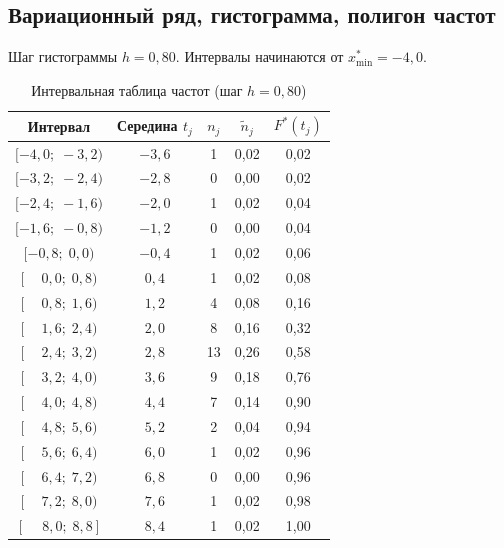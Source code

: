 \documentclass[12pt,a4paper]{article}
\begin{document}
	
	\subsection{Вариационный ряд, гистограмма, полигон частот}
	
	Шаг гистограммы $h = 0{,}80$. Интервалы начинаются от $x_{\min}^* = -4{,}0$.
	
	\begin{table}[H]
		\centering
		\small
		\begin{tabular}{ccccc}
			\toprule
			Интервал & Середина $t_j$ & $n_j$ & $\tilde{n}_j$ & $F^*(t_j)$ \\
			\midrule
			$[-4{,}0;\;-3{,}2)$ & $-3{,}6$ & 1 & 0{,}02 & 0{,}02 \\
			$[-3{,}2;\;-2{,}4)$ & $-2{,}8$ & 0 & 0{,}00 & 0{,}02 \\
			$[-2{,}4;\;-1{,}6)$ & $-2{,}0$ & 1 & 0{,}02 & 0{,}04 \\
			$[-1{,}6;\;-0{,}8)$ & $-1{,}2$ & 0 & 0{,}00 & 0{,}04 \\
			$[-0{,}8;\; 0{,}0)$ & $-0{,}4$ & 1 & 0{,}02 & 0{,}06 \\
			$[\phantom{-}0{,}0;\; 0{,}8)$ & $0{,}4$ & 1 & 0{,}02 & 0{,}08 \\
			$[\phantom{-}0{,}8;\; 1{,}6)$ & $1{,}2$ & 4 & 0{,}08 & 0{,}16 \\
			$[\phantom{-}1{,}6;\; 2{,}4)$ & $2{,}0$ & 8 & 0{,}16 & 0{,}32 \\
			$[\phantom{-}2{,}4;\; 3{,}2)$ & $2{,}8$ & 13 & 0{,}26 & 0{,}58 \\
			$[\phantom{-}3{,}2;\; 4{,}0)$ & $3{,}6$ & 9 & 0{,}18 & 0{,}76 \\
			$[\phantom{-}4{,}0;\; 4{,}8)$ & $4{,}4$ & 7 & 0{,}14 & 0{,}90 \\
			$[\phantom{-}4{,}8;\; 5{,}6)$ & $5{,}2$ & 2 & 0{,}04 & 0{,}94 \\
			$[\phantom{-}5{,}6;\; 6{,}4)$ & $6{,}0$ & 1 & 0{,}02 & 0{,}96 \\
			$[\phantom{-}6{,}4;\; 7{,}2)$ & $6{,}8$ & 0 & 0{,}00 & 0{,}96 \\
			$[\phantom{-}7{,}2;\; 8{,}0)$ & $7{,}6$ & 1 & 0{,}02 & 0{,}98 \\
			$[\phantom{-}8{,}0;\; 8{,}8]$ & $8{,}4$ & 1 & 0{,}02 & 1{,}00 \\
			\bottomrule
		\end{tabular}
		\caption{Интервальная таблица частот (шаг $h=0{,}80$)}
	\end{table}
	
\end{document}
